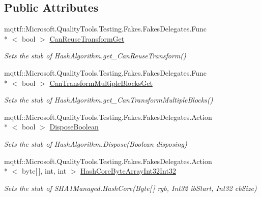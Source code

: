 \subsection*{Public Attributes}
\begin{DoxyCompactItemize}
\item 
mqttf\-::\-Microsoft.\-Quality\-Tools.\-Testing.\-Fakes.\-Fakes\-Delegates.\-Func\\*
$<$ bool $>$ \hyperlink{class_system_1_1_security_1_1_cryptography_1_1_fakes_1_1_stub_s_h_a1_managed_a4ae018276989080c010feeb67ca5bbc9}{Can\-Reuse\-Transform\-Get}
\begin{DoxyCompactList}\small\item\em Sets the stub of Hash\-Algorithm.\-get\-\_\-\-Can\-Reuse\-Transform()\end{DoxyCompactList}\item 
mqttf\-::\-Microsoft.\-Quality\-Tools.\-Testing.\-Fakes.\-Fakes\-Delegates.\-Func\\*
$<$ bool $>$ \hyperlink{class_system_1_1_security_1_1_cryptography_1_1_fakes_1_1_stub_s_h_a1_managed_af7476cd104a4e512e95cbaad6040983c}{Can\-Transform\-Multiple\-Blocks\-Get}
\begin{DoxyCompactList}\small\item\em Sets the stub of Hash\-Algorithm.\-get\-\_\-\-Can\-Transform\-Multiple\-Blocks()\end{DoxyCompactList}\item 
mqttf\-::\-Microsoft.\-Quality\-Tools.\-Testing.\-Fakes.\-Fakes\-Delegates.\-Action\\*
$<$ bool $>$ \hyperlink{class_system_1_1_security_1_1_cryptography_1_1_fakes_1_1_stub_s_h_a1_managed_a5d33018264b82db61fba0f3c8ce2f230}{Dispose\-Boolean}
\begin{DoxyCompactList}\small\item\em Sets the stub of Hash\-Algorithm.\-Dispose(\-Boolean disposing)\end{DoxyCompactList}\item 
mqttf\-::\-Microsoft.\-Quality\-Tools.\-Testing.\-Fakes.\-Fakes\-Delegates.\-Action\\*
$<$ byte\mbox{[}$\,$\mbox{]}, int, int $>$ \hyperlink{class_system_1_1_security_1_1_cryptography_1_1_fakes_1_1_stub_s_h_a1_managed_ad26495b84f5f77ced83a522d85b97c03}{Hash\-Core\-Byte\-Array\-Int32\-Int32}
\begin{DoxyCompactList}\small\item\em Sets the stub of S\-H\-A1\-Managed.\-Hash\-Core(\-Byte\mbox{[}$\,$\mbox{]} rgb, Int32 ib\-Start, Int32 cb\-Size)\end{DoxyCompactList}\item 

\end{DoxyCompactItemize}
